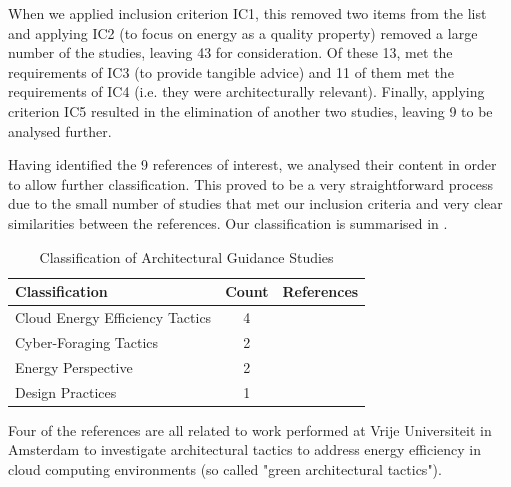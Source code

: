 When we applied inclusion criterion IC1, this removed two items from the list and applying IC2 (to focus on energy as a quality property) removed a large number of the studies, leaving 43 for consideration.  Of these 13, met the requirements of IC3 (to provide tangible advice) and 11 of them met the requirements of IC4 (i.e. they were architecturally relevant).  Finally, applying criterion IC5 resulted in the elimination of another two studies, leaving 9 to be analysed further.

Having identified the 9 references of interest, we analysed their content in order to allow further classification.  This proved to be a very straightforward process due to the small number of studies that met our inclusion criteria and very clear similarities between the references.  Our classification is summarised in .

\begin{table}
\caption{Classification of Architectural Guidance Studies}
\label{table:archguidancestudies}
\begin{center}
\begin{tabular}{| l | c | l |}
\hline

\textbf{Classification} & \textbf{Count} & \textbf{References} \\
\hline

Cloud Energy Efficiency Tactics & 4 & \cite{procaccianti2013-cloudenergyefficiency, procaccianti2014-greentactics, procaccianti2014-greentactics-wicsa, procaccianti2015-cloudenergy-litreview} \\
\hline

Cyber-Foraging Tactics & 2 & \cite{lewis2015-foragingtactics, lewis2016-foragingdm} \\
\hline

Energy Perspective & 2 & \cite{jagroep2015-energyperspective, jagroep2017-energyperspective} \\
\hline

Design Practices & 1 & \cite{procaccianti2016-twobestpractices} \\
\hline

\end{tabular}
\end{center}
\end{table}

Four of the references \cite{procaccianti2013-cloudenergyefficiency, procaccianti2014-greentactics-wicsa, procaccianti2015-cloudenergy-litreview} are all related to work performed at Vrije Universiteit in Amsterdam to investigate architectural tactics to address energy efficiency in cloud computing environments (so called "green architectural tactics").


